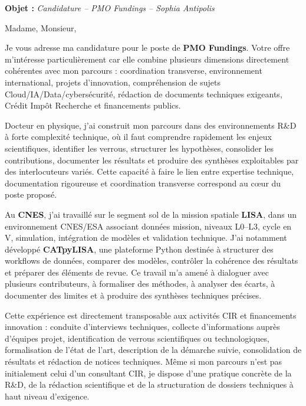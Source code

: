 \documentclass[11pt,a4paper]{altacv}
\begin{document}
\makecvheader
\vspace{-0.6cm}

\vspace{-0.4cm}

{\color{accent}\textbf{Objet :}} \textit{Candidature -- PMO Fundings -- Sophia Antipolis}

{\color{body}

Madame, Monsieur,

Je vous adresse ma candidature pour le poste de \textbf{PMO Fundings}. Votre offre m'intéresse particulièrement car elle combine plusieurs dimensions directement cohérentes avec mon parcours : coordination transverse, environnement international, projets d'innovation, compréhension de sujets Cloud/IA/Data/cybersécurité, rédaction de documents techniques exigeants, Crédit Impôt Recherche et financements publics.

Docteur en physique, j'ai construit mon parcours dans des environnements R\&D à forte complexité technique, où il faut comprendre rapidement les enjeux scientifiques, identifier les verrous, structurer les hypothèses, consolider les contributions, documenter les résultats et produire des synthèses exploitables par des interlocuteurs variés. Cette capacité à faire le lien entre expertise technique, documentation rigoureuse et coordination transverse correspond au cœur du poste proposé.

Au \textbf{CNES}, j'ai travaillé sur le segment sol de la mission spatiale \textbf{LISA}, dans un environnement CNES/ESA associant données mission, niveaux L0--L3, cycle en V, simulation, intégration de modèles et validation technique. J'ai notamment développé \textbf{CATpyLISA}, une plateforme Python destinée à structurer des workflows de données, comparer des modèles, contrôler la cohérence des résultats et préparer des éléments de revue. Ce travail m'a amené à dialoguer avec plusieurs contributeurs, à formaliser des méthodes, à analyser des écarts, à documenter des limites et à produire des synthèses techniques précises.

Cette expérience est directement transposable aux activités CIR et financements innovation : conduite d'interviews techniques, collecte d'informations auprès d'équipes projet, identification de verrous scientifiques ou technologiques, formalisation de l'état de l'art, description de la démarche suivie, consolidation de résultats et rédaction de notices techniques. Même si mon parcours n'est pas initialement celui d'un consultant CIR, je dispose d'une pratique concrète de la R\&D, de la rédaction scientifique et de la structuration de dossiers techniques à haut niveau d'exigence.

}
\end{document}
